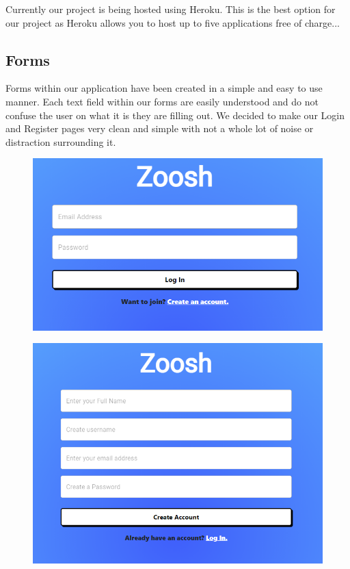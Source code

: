 Currently our project is being hosted using Heroku. This is the best option for our project as Heroku allows you to host up to five applications free of charge...

\subsection{Forms}
Forms within our application have been created in a simple and easy to use manner. Each text field within our forms are easily understood and do not confuse the user on what it is they are filling out. We decided to make our Login and Register pages very clean and simple with not a whole lot of noise or distraction surrounding it. 

\begin{figure}[H]
  \centering
  \includegraphics[scale=0.45]{img/login.PNG}
  \label{fig:Login Screen}
\end{figure}

\begin{figure}[H]
  \centering
  \includegraphics[scale=0.45]{img/join.PNG}
  \label{fig:Join Screen}
\end{figure}

